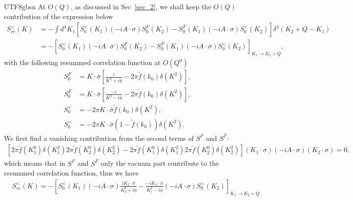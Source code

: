 \documentclass[11pt]{article}\def\baselinestretch{1.4}
\begin{document}
\begin{CJK}{UTF8}{gbsn}
At $O(Q)$, as discussed in Sec~\ref{sec_2}, we shall keep the $O(Q)$ contribution of the expression below
\begin{align}
S^<_{re}(K) &= -\int d^4K_1 \left[ S_0^<(K_1)(-iA\cdot \sigma )S_0^F(K_2)-S_0^{\bar{F}}(K_1)(-iA\cdot \sigma )S_0^<(K_2) \right] \delta ^4(K_2+Q-K_1) \nonumber\\
&= -\left[S_0^<(K_1)(-iA\cdot \sigma )S_0^F(K_2)-S_0^{\bar{F}}(K_1)(-iA\cdot \sigma )S_0^<(K_2)\right]_{K_1\to K_2+Q},
\end{align}
with the following resummed correlation function at $O(Q^0)$
\begin{equation}
\begin{aligned}
S^F_0 &= K\cdot \bar{\sigma}\left[ \frac{i}{K^2+i \eta }-2\pi \tilde{f}(k_0)\delta (K^2) \right] ,\\
S^{\bar{F}}_0 &= K\cdot \bar{\sigma}\left[ \frac{-i}{K^2-i \eta }-2\pi \tilde{f}(k_0)\delta (K^2) \right] ,\\
S^<_0 &= -2\pi K\cdot \bar{\sigma}\tilde{f}(k_0)\delta (K^2) ,\\
S^>_0 &= -2\pi K\cdot \bar{\sigma}(1-\tilde{f}(k_0))\delta (K^2).
\end{aligned}
\end{equation}
We first find a vanishing contribution from the second terms of $S^F$ and $S^{\bar{F}}$:
\begin{align}
\left[ 2\pi \tilde{f}(K_1^0)\delta (K_1^2)2\pi \tilde{f}(K_2^0)\delta (K_2^2)-2\pi \tilde{f}(K_1^0)\delta (K_1^2)2\pi \tilde{f}(K_2^0)\delta (K_2^2) \right](K_1 \cdot \sigma )(-iA \cdot \sigma )(K_2 \cdot \sigma ) = 0,
\end{align}
which means that in $S^F$ and $S^{\bar{F}}$ only the vacuum part contribute to the resummed correlation function, thus we have %
\begin{align}\label{resum_KMS}
&S^<_{re}(K) = -\left[S_0^<(K_1)(-iA\cdot \sigma )\frac{iK_2\cdot \bar{\sigma }}{K_2^2+i \eta }-\frac{-iK_1\cdot \bar{\sigma }}{K_1^2-i \eta }(-iA\cdot \sigma )S_0^<(K_2)\right]_{K_1\to K_2+Q}\nonumber\\

\end{align}
\end{CJK}
\end{document}
